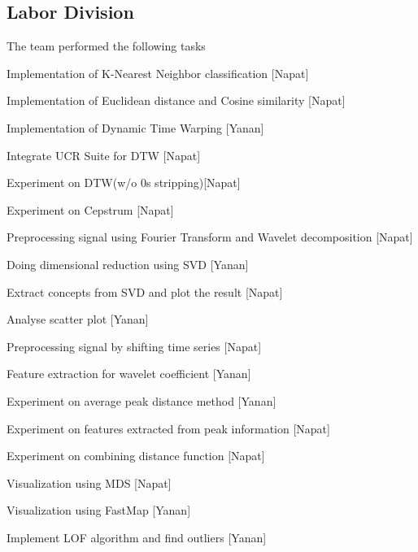 
\subsection{Labor Division}

The team performed the following tasks
\bit
\item Implementation of K-Nearest Neighbor classification [Napat]
\item Implementation of Euclidean distance and Cosine similarity  [Napat]
\item Implementation of Dynamic Time Warping  [Yanan]
\item Integrate UCR Suite for DTW [Napat]
\item Experiment on DTW(w/o 0s stripping)[Napat]
\item Experiment on Cepstrum [Napat]
\item Preprocessing signal using Fourier Transform and Wavelet decomposition [Napat]
\item Doing dimensional reduction using SVD [Yanan]
\item Extract concepts from SVD and plot the result [Napat]
\item Analyse scatter plot [Yanan]
\item Preprocessing signal by shifting time series [Napat]
\item Feature extraction for wavelet coefficient [Yanan]
\item Experiment on average peak distance method [Yanan]
\item Experiment on features extracted from peak information [Napat]
\item Experiment on combining distance function [Napat]
\item Visualization using MDS [Napat]
\item Visualization using FastMap [Yanan]
\item Implement LOF algorithm and find outliers [Yanan]
\eit


